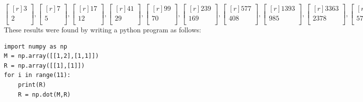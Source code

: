 \documentclass[12pt]{article}
\theoremstyle{definition}
\theoremstyle{plain}
\begin{document}
\begin{enumerate}
\begin{enumerate}
\[ \begin{bmatrix}[r]3\\2\\\end{bmatrix},\begin{bmatrix}[r]7\\5\\\end{bmatrix},\begin{bmatrix}[r]17\\12\\\end{bmatrix},\begin{bmatrix}[r]41\\29\\\end{bmatrix},\begin{bmatrix}[r]99\\70\\\end{bmatrix},\begin{bmatrix}[r]239\\169\\\end{bmatrix},\begin{bmatrix}[r]577\\408\\\end{bmatrix},\begin{bmatrix}[r]1393\\985\\\end{bmatrix},\begin{bmatrix}[r]3363\\2378\\\end{bmatrix},\begin{bmatrix}[r]8119\\5741\\\end{bmatrix} \]
These results were found by writing a python program as follows:
\begin{verbatim}
import numpy as np
M = np.array([[1,2],[1,1]])
R = np.array([[1],[1]])
for i in range(11):
    print(R)
    R = np.dot(M,R)
\end{verbatim}


\end{enumerate}
\end{enumerate}
\end{document}
